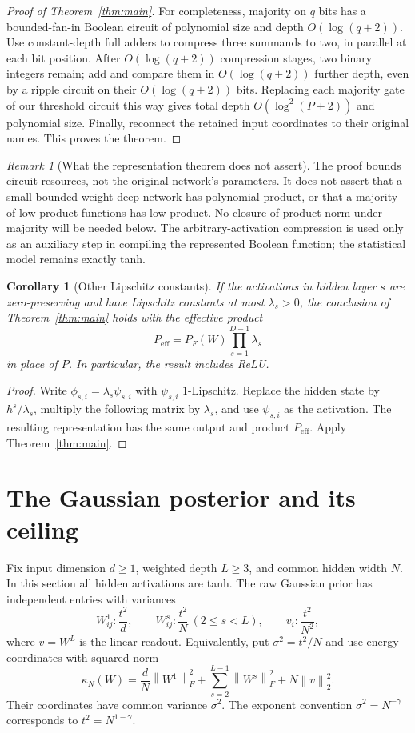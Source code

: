 \documentclass[11pt]{article}
\newtheorem{corollary}[theorem]{Corollary}
\theoremstyle{remark}
\newtheorem{remark}[theorem]{Remark}
\newcommand{\norm}[1]{\left\lVert #1\right\rVert}
\begin{document}
\begin{proof}[Proof of Theorem~\ref{thm:main}]
For completeness, majority on $q$ bits has a bounded-fan-in Boolean
circuit of polynomial size and depth $O(\log(q+2))$. Use constant-depth
full adders to compress three summands to two, in parallel at each bit
position. After $O(\log(q+2))$ compression stages, two binary integers
remain; add and compare them in $O(\log(q+2))$ further depth, even by
a ripple circuit on their $O(\log(q+2))$ bits. Replacing each majority
gate of our threshold circuit this way gives total depth
$O(\log^2(P+2))$ and polynomial size. Finally, reconnect the retained
input coordinates to their original names. This proves the theorem.
\end{proof}

\begin{remark}[What the representation theorem does not assert]
The proof bounds circuit resources, not the original network's
parameters. It does not assert that a small bounded-weight deep
network has polynomial product, or that a majority of low-product
functions has low product. No closure of product norm under majority
will be needed below. The arbitrary-activation compression is used
only as an auxiliary step in compiling the represented Boolean
function; the statistical model remains exactly tanh.
\end{remark}

\begin{corollary}[Other Lipschitz constants]
If the activations in hidden layer $s$ are zero-preserving and have
Lipschitz constants at most $\lambda_s>0$, the conclusion of
Theorem~\ref{thm:main} holds with the effective product
\[
 P_{\mathrm{eff}}=P_F(W)\prod_{s=1}^{D-1}\lambda_s
\]
in place of $P$. In particular, the result includes ReLU.
\end{corollary}
\begin{proof}
Write $\phi_{s,i}=\lambda_s\psi_{s,i}$ with $\psi_{s,i}$
$1$-Lipschitz. Replace the hidden state by $h^s/\lambda_s$, multiply
the following matrix by $\lambda_s$, and use $\psi_{s,i}$ as the
activation. The resulting representation has the same output and
product $P_{\mathrm{eff}}$. Apply Theorem~\ref{thm:main}.
\end{proof}

\section{The Gaussian posterior and its ceiling}
\label{sec:ceiling}

Fix input dimension $d\ge1$, weighted depth $L\ge3$, and common hidden
width $N$. In this section all hidden activations are tanh. The raw
Gaussian prior has independent entries with variances
\[
 W^1_{ij}:\frac{t^2}{d},\qquad
 W^s_{ij}:\frac{t^2}{N}\ (2\le s<L),\qquad
 v_i:\frac{t^2}{N^2},
\]
where $v=W^L$ is the linear readout. Equivalently, put
$\sigma^2=t^2/N$ and use energy coordinates with squared norm
\[
 \kappa_N(W)=\frac dN\norm{W^1}_F^2+
       \sum_{s=2}^{L-1}\norm{W^s}_F^2+N\norm v_2^2.
\]
Their coordinates have common variance $\sigma^2$.
The exponent convention $\sigma^2=N^{-\gamma}$ corresponds to
$t^2=N^{1-\gamma}$.
\end{document}
